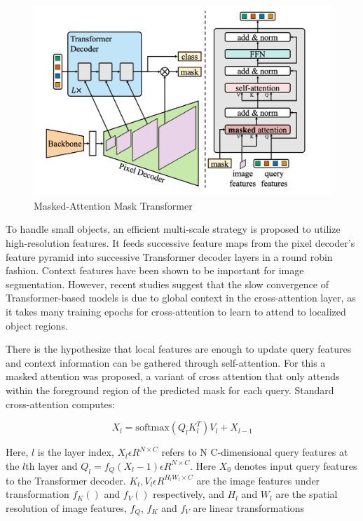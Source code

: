 \begin{figure}[h!]
    \centering
    \includegraphics[scale=0.8]{Figures/MaskAttentionMaskTransformer.jpg}
    \caption{Masked-Attention Mask Transformer \cite{mamt2}}
    \label{fig:mamt}
\end{figure}


To handle small objects, an efficient multi-scale strategy is proposed to utilize high-resolution features. It feeds successive feature maps from the 
pixel decoder’s feature pyramid into successive Transformer  decoder layers in a round robin fashion. 
Context features have been shown to be important for image segmentation. However, recent studies \cite{instasqueries, FaPN, segmenter} suggest that the slow convergence of 
Transformer-based models is due to global context in the cross-attention layer, as it takes many training epochs for cross-attention to learn to attend to 
localized object regions. 

\newpage
There is the hypothesize that local features are enough to update query features and context information can be gathered through self-attention. 
For this a masked attention was proposed, a variant of cross attention that only attends within the foreground region of the predicted mask for each query. 
Standard cross-attention computes:

\begin{equation}
    X_l = \text{softmax}(Q_l K_l^T) V_l + X_{l-1} \tag{6}
\end{equation}

Here, $l$ is the layer index, $X_l \epsilon R^{N \times C}$ refers to N C-dimensional query features at the $l$th layer and 
$Q_l = f_Q(X_l-1) \epsilon R^{N \times C} $. Here $X_0$ denotes input query features to the Transformer decoder. $K_l, V_l \epsilon R^{H_l W_l \times C}$ are the 
image features under transformation $f_K()$ and $f_{V}()$ respectively, and $H_l$ and $W_l$ are the spatial resolution of image features, $f_Q$, $f_K$ and $f_V$ are 
linear transformations



